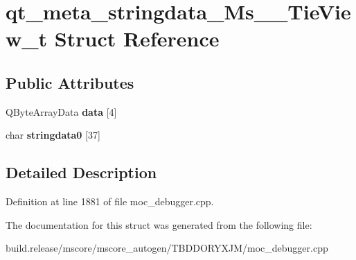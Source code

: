 \hypertarget{structqt__meta__stringdata___ms_____tie_view__t}{}\section{qt\+\_\+meta\+\_\+stringdata\+\_\+\+Ms\+\_\+\+\_\+\+Tie\+View\+\_\+t Struct Reference}
\label{structqt__meta__stringdata___ms_____tie_view__t}
\subsection*{Public Attributes}
\begin{DoxyCompactItemize}
\item 
\mbox{\label{structqt__meta__stringdata___ms_____tie_view__t_a59ad3ba260bf127d237a44faeb6da195}} 
Q\+Byte\+Array\+Data {\bfseries data} \mbox{[}4\mbox{]}
\item 
\mbox{\label{structqt__meta__stringdata___ms_____tie_view__t_a09a1a6973c292ec052c0102e0e19414f}} 
char {\bfseries stringdata0} \mbox{[}37\mbox{]}
\end{DoxyCompactItemize}


\subsection{Detailed Description}


Definition at line 1881 of file moc\+\_\+debugger.\+cpp.



The documentation for this struct was generated from the following file\+:\begin{DoxyCompactItemize}
\item 
build.\+release/mscore/mscore\+\_\+autogen/\+T\+B\+D\+D\+O\+R\+Y\+X\+J\+M/moc\+\_\+debugger.\+cpp\end{DoxyCompactItemize}
